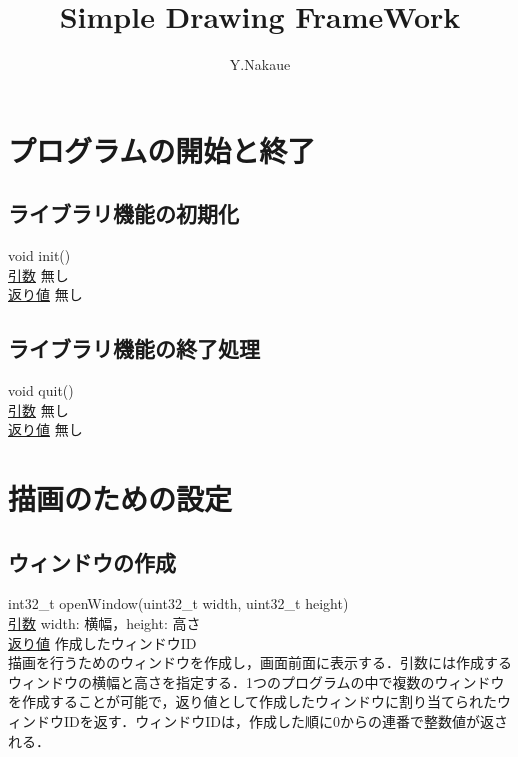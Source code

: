 \documentclass[a4paper, 11pt, oneside, onecolumn, openany]{jsarticle}
\begin{document}

\title{\vspace{-3cm}Simple Drawing FrameWork}
\author{Y.Nakaue}
\maketitle


\section{プログラムの開始と終了}
\subsection{ライブラリ機能の初期化}
\noindent
\tab void init() \\
\tab \underline{引数} \tab 無し \\
\tab \underline{返り値} \tab 無し \\

\subsection{ライブラリ機能の終了処理}
\tab void quit() \\
\tab \underline{引数} \tab 無し \\
\tab \underline{返り値} \tab 無し \\


\section{描画のための設定}
\subsection{ウィンドウの作成}
\noindent
\tab int32\_t openWindow(uint32\_t width, uint32\_t height) \\
\tab \underline{引数} \tab width: 横幅，height: 高さ \\
\tab \underline{返り値} \tab 作成したウィンドウID \\

描画を行うためのウィンドウを作成し，画面前面に表示する．引数には作成するウィンドウの横幅と高さを指定する．1つのプログラムの中で複数のウィンドウを作成することが可能で，返り値として作成したウィンドウに割り当てられたウィンドウIDを返す．ウィンドウIDは，作成した順に0からの連番で整数値が返される．
\end{document}
